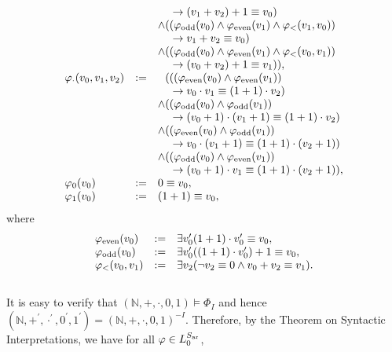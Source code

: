 \begin{enumerate}[1.]
\begin{enumerate}[(a)]
\[\begin{array}{lll}
\  & \  & \phantom{\land(} \rightarrow (v_1 + v_2) + 1 \equiv v_0) \\
\  & \  & \land ((\varphi_{\mbox{\scriptsize odd}}(v_0) \land \varphi_{\mbox{\scriptsize even}}(v_1) \land \varphi_< (v_1, v_0)) \\
\  & \  & \phantom{\land(} \rightarrow v_1 + v_2 \equiv v_0) \\
\  & \  & \land ((\varphi_{\mbox{\scriptsize odd}}(v_0) \land \varphi_{\mbox{\scriptsize even}}(v_1) \land \varphi_< (v_0, v_1)) \\
\  & \  & \phantom{\land(} \rightarrow (v_0 + v_2) + 1 \equiv v_1)), \\
\varphi_\cdot(v_0, v_1, v_2) & := & \phantom{\land}(((\varphi_{\mbox{\scriptsize even}}(v_0) \land \varphi_{\mbox{\scriptsize even}}(v_1)) \\
\  & \  & \phantom{\land(} \rightarrow v_0 \cdot v_1 \equiv (1 + 1) \cdot v_2) \\
\  & \  & \land ((\varphi_{\mbox{\scriptsize odd}}(v_0) \land \varphi_{\mbox{\scriptsize odd}}(v_1)) \\
\  & \  & \phantom{\land(} \rightarrow (v_0 + 1) \cdot (v_1 + 1) \equiv (1 + 1) \cdot v_2) \\
\  & \  & \land ((\varphi_{\mbox{\scriptsize even}}(v_0) \land \varphi_{\mbox{\scriptsize odd}}(v_1)) \\
\  & \  & \phantom{\land(} \rightarrow v_0 \cdot (v_1 + 1) \equiv (1 + 1) \cdot (v_2 + 1)) \\
\  & \  & \land ((\varphi_{\mbox{\scriptsize odd}}(v_0) \land \varphi_{\mbox{\scriptsize even}}(v_1)) \\
\  & \  & \phantom{\land(} \rightarrow (v_0 + 1) \cdot v_1 \equiv (1 + 1) \cdot (v_2 + 1)), \\
\varphi_0(v_0) & := & 0 \equiv v_0, \\
\varphi_1(v_0) & := & (1 + 1) \equiv v_0,
\end{array}
\]
where
\[
\begin{array}{lll}
\varphi_{\mbox{\scriptsize even}}(v_0) & := & \exists v_0^\prime (1 + 1) \cdot v_0^\prime \equiv v_0, \\
\varphi_{\mbox{\scriptsize odd}}(v_0)  & := & \exists v_0^\prime ((1 + 1) \cdot v_0^\prime) + 1 \equiv v_0, \\
\varphi_<(v_0, v_1)                    & := & \exists v_2 (\neg v_2 \equiv 0 \land v_0 + v_2 \equiv v_1).
\end{array}
\]
\\
It is easy to verify that $(\mathbb{N}, +, \cdot, 0, 1) \models \Phi_I$ and hence $(\mathbb{N}, +^\prime, \cdot^\prime, 0^\prime, 1^\prime) = (\mathbb{N}, +, \cdot, 0, 1)^{-I}$. Therefore, by the Theorem on Syntactic Interpretations, we have for all $\varphi \in L_0^{S_{\mbox{\tiny ar}}}$,

\end{enumerate}
\end{enumerate}
